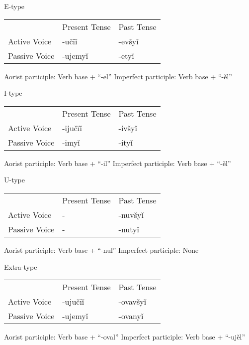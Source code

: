 E-type

\begin{table}
	\begin{tabular}{lll}
		& Present Tense & Past Tense \\
		Active Voice & -učïǐ & -evšyǐ \\
		Passive Voice & -ujemyǐ & -etyǐ
	\end{tabular}
\end{table}

Aorist participle: Verb base + “-el”
Imperfect participle: Verb base + “-ěl”

I-type

\begin{table}
	\begin{tabular}{lll}
		& Present Tense & Past Tense \\
		Active Voice & -ijučïǐ & -ivšyǐ \\
		Passive Voice & -imyǐ & -ityǐ
	\end{tabular}
\end{table}

Aorist participle: Verb base + “-il”
Imperfect participle: Verb base + “-ěl”

U-type

\begin{table}
	\begin{tabular}{lll}
		& Present Tense & Past Tense \\
		Active Voice & - & -nuvšyǐ \\
		Passive Voice & - & -nutyǐ
	\end{tabular}
\end{table}

Aorist participle: Verb base + “-nul”
Imperfect participle: None

Extra-type 

\begin{table}
	\begin{tabular}{lll}
		& Present Tense & Past Tense \\
		Active Voice & -ujučïǐ & -ovavšyǐ \\
		Passive Voice & -ujemyǐ & -ovanyǐ
	\end{tabular}
\end{table}

Aorist participle: Verb base + “-oval”
Imperfect participle: Verb base + “-ujěl”
